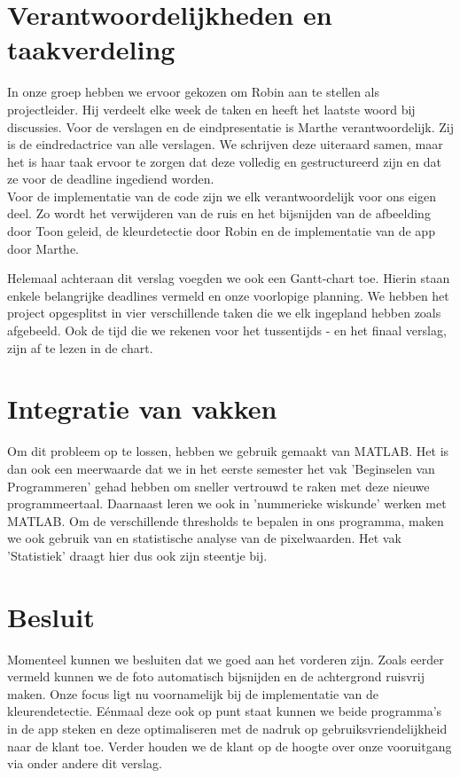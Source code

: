 \documentclass[a4paper,kulak]{kulakarticle}
\begin{document}
	\section{Verantwoordelijkheden en taakverdeling}		
		In onze groep hebben we ervoor gekozen om Robin aan te stellen als projectleider. Hij verdeelt elke week de taken en heeft het laatste woord bij discussies. 
		Voor de verslagen en de eindpresentatie is Marthe verantwoordelijk. Zij is de eindredactrice van alle verslagen. We schrijven deze uiteraard samen, maar het is haar taak ervoor te zorgen dat deze volledig en gestructureerd zijn en dat ze voor de deadline ingediend worden.\\
		Voor de implementatie van de code zijn we elk verantwoordelijk voor ons eigen deel. Zo wordt het verwijderen van de ruis en het bijsnijden van de afbeelding door Toon geleid, de kleurdetectie door Robin en de implementatie van de app door Marthe.
		
		Helemaal achteraan dit verslag voegden we ook een Gantt-chart toe. Hierin staan enkele belangrijke deadlines vermeld en onze voorlopige planning. We hebben het project opgesplitst in vier verschillende taken die we elk ingepland hebben zoals afgebeeld. Ook de tijd die we rekenen voor het tussentijds - en het finaal verslag, zijn af te lezen in de chart.
		
	\section{Integratie van vakken}
		Om dit probleem op te lossen, hebben we gebruik gemaakt van MATLAB. Het is dan ook een meerwaarde dat we in het eerste semester het vak 'Beginselen van Programmeren' gehad hebben om sneller vertrouwd te raken met deze nieuwe programmeertaal. Daarnaast leren we ook in 'nummerieke wiskunde' werken met MATLAB. Om de verschillende thresholds te bepalen in ons programma, maken we ook gebruik van en statistische analyse van de pixelwaarden. Het vak 'Statistiek' draagt hier dus ook zijn steentje bij.
	
	\section{Besluit}	
		Momenteel kunnen we besluiten dat we goed aan het vorderen zijn. Zoals eerder vermeld kunnen we de foto automatisch bijsnijden en de achtergrond ruisvrij maken. Onze focus ligt nu voornamelijk bij de implementatie van de kleurendetectie. Eénmaal deze ook op punt staat kunnen we beide programma's in de app steken en deze optimaliseren met de nadruk op gebruiksvriendelijkheid naar de klant toe. Verder houden we de klant op de hoogte over onze vooruitgang via onder andere dit verslag. 
		
\end{document}
